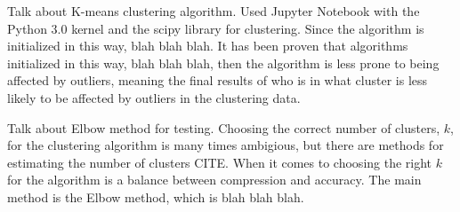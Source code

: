 \documentclass[../main.txt]{subfiles}
\begin{document}
Talk about K-means clustering algorithm. Used Jupyter Notebook with the
Python 3.0 kernel and the scipy library for clustering. Since the algorithm
is initialized in this way, blah blah blah. It has been proven that
algorithms initialized in this way, blah blah blah, then the algorithm is
less prone to being affected by outliers, meaning the final results of who
is in what cluster is less likely to be affected by outliers in the
clustering data.

Talk about Elbow method for testing. Choosing the correct number of
clusters, $k$, for the clustering algorithm is many times ambigious,
but there are methods for estimating the number of clusters CITE. When it
comes to choosing the right $k$ for the algorithm is a balance between
compression and accuracy. The main method is the Elbow method, which is blah
blah blah.


\biblo
\end{document}
